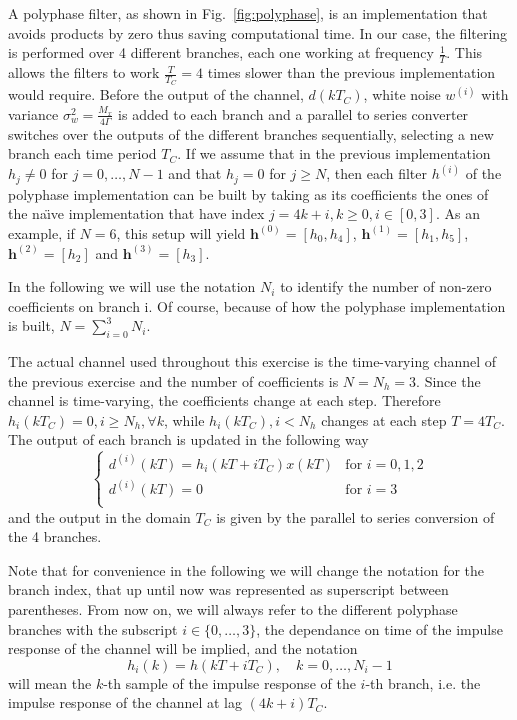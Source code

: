 \documentclass[10pt]{article}
\begin{document}
A polyphase filter, as shown in Fig.~\ref{fig:polyphase}, is an implementation that avoids products by zero thus saving computational time. In our case, the filtering is performed over 4 different branches, each one working at frequency $\frac{1}{T}$. This allows the filters to work $\frac{T}{T_C} = 4$ times slower than the previous implementation would require. Before the output of the channel, $d(kT_C)$, white noise $w^{(i)}$ with variance $\sigma^2_w = \frac{M_x}{4\Gamma}$ is added to each branch and a parallel to series converter switches over the outputs of the different branches sequentially, selecting a new branch each time period $T_C$. If we assume that in the previous implementation $h_j \ne 0$ for $j = 0, \dots, N - 1$ and that $h_j = 0$ for $j \ge N$,
then each filter $h^{(i)}$ of the polyphase implementation can be built by taking as its coefficients the ones of the na\"{\i}ve implementation that have index $j = 4k + i, k \ge 0, i \in [0,3]$.
As an example, if $N = 6$, this setup will yield $\mathbf{h}^{(0)} = [h_0, h_4]$, $\mathbf{h}^{(1)} = [h_1, h_5]$, $\mathbf{h}^{(2)} = [h_2]$ and $\mathbf{h}^{(3)} = [h_3]$.

In the following we will use the notation $N_i$ to identify the number of non-zero coefficients on branch i. Of course, because of how the polyphase implementation is built, $N = \sum_{i = 0}^{3} N_i$.

The actual channel used throughout this exercise is the time-varying channel of the previous exercise and the number of coefficients is $N = N_h = 3$. Since the channel is time-varying, the coefficients change at each step. Therefore $h_i(kT_C) = 0, i \ge N_h, \forall k$, while $h_i(kT_C), i < N_h$ changes at each step $T = 4T_C$. The output of each branch is updated in the following way
\begin{equation}
  \begin{cases}
  d^{(i)}(kT) = h_i(kT + iT_C)x(kT) & \mbox{for } i = 0, 1, 2 \\
  d^{(i)}(kT) = 0                   & \mbox{for } i = 3 \\
  \end{cases}
\end{equation}
and the output in the domain $T_C$ is given by the parallel to series conversion of the 4 branches.

Note that for convenience in the following we will change the notation for the branch index, that up until now was represented as superscript between parentheses. From now on, we will always refer to the different polyphase branches with the subscript $i \in \{0,\ldots,3\}$, the dependance on time of the impulse response of the channel will be implied, and the notation
\begin{equation}\label{eq:def_ir_branch}
h_i(k) = h(kT+iT_C), \quad k=0,\ldots,N_i-1
\end{equation}
will mean the $k$-th sample of the impulse response of the $i$-th branch, i.e. the impulse response of the channel at lag $(4k+i)T_C$.
\end{document}
